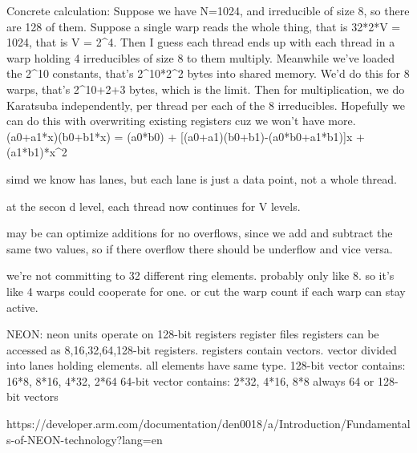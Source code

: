 Concrete calculation:
Suppose we have N=1024, and irreducible of size 8, so there are 128 of them.
Suppose a single warp reads the whole thing, that is 32*2*V = 1024, that is V = 2^4.
Then I guess each thread ends up with each thread in a warp holding 4 irreducibles of size 8 to them multiply.
Meanwhile we've loaded the 2^10 constants, that's 2^10*2^2 bytes into shared memory. We'd do this for 8 warps, that's 2^{10+2+3} bytes, which is the limit. 
Then for multiplication, we do Karatsuba independently, per thread per each of the 8 irreducibles. Hopefully we can do this with overwriting existing registers cuz we won't have more. 
(a0+a1*x)(b0+b1*x) = (a0*b0) + [(a0+a1)(b0+b1)-(a0*b0+a1*b1)]x + (a1*b1)*x^2











simd we know has lanes, but each lane is just a data point, not a whole thread.







at the secon d level, each thread now continues for V levels.

may be can optimize additions for no overflows, since we add and subtract the same two values, so if there overflow there should be underflow and vice versa. 




we're not committing to 32 different ring elements. probably only like 8. so it's like 4 warps could cooperate for one. or cut the warp count if each warp can stay active.



NEON:
neon units operate on 128-bit registers register files
registers can be accessed as 8,16,32,64,128-bit registers.
registers contain vectors.
vector divided into lanes holding elements. all elements have same type.
128-bit vector contains: 16*8, 8*16, 4*32, 2*64
64-bit vector contains: 2*32, 4*16, 8*8
always 64 or 128-bit vectors

https://developer.arm.com/documentation/den0018/a/Introduction/Fundamentals-of-NEON-technology?lang=en


